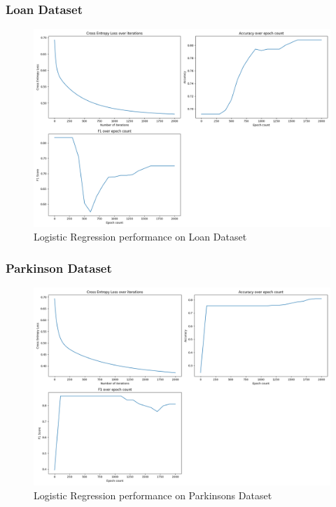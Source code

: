 \documentclass[letterpaper]{article}
\begin{document}
\subsubsection*{Loan Dataset}

\begin{figure}[H]
	\includegraphics[width=\textwidth]{figures/logistics_loan.csv.png}
	\caption{Logistic Regression performance on Loan Dataset}
	\label{fig:logistics-loan}
\end{figure}

\subsubsection*{Parkinson Dataset}
\begin{figure}[H]
	\includegraphics[width=\textwidth]{figures/logistics_parkinsons.csv.png}
	\caption{Logistic Regression performance on Parkinsons Dataset}
	\label{fig:logistics-parkinsons}
\end{figure}
\end{document}
